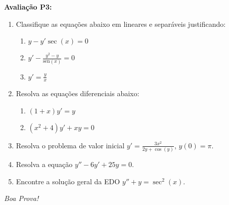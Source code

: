 \documentclass[a4paper,5pt]{amsbook}
\newcommand{\sen}{\text{sen}}
\newcommand{\ds}{\displaystyle}
\begin{document}
\textbf{Avalia\c{c}\~ao P3:}
\begin{enumerate}
\item Classifique as equa\c{c}\~oes abaixo em lineares e separ\'aveis justificando:
	\begin{enumerate}
		\item $\ds y - y' \sec(x) = 0$
		\item $\ds y' - \frac{y^2-y}{\sen(x)} = 0$
		\item $\ds y' = \frac{y}{x}$
	\end{enumerate}

\item Resolva as equa\c{c}\~oes diferenciais abaixo:
	\begin{enumerate}
		\item $(1+x)y' = y$
		\item $(x^2+4)y' + xy = 0$
	\end{enumerate}

\item Resolva o problema de valor inicial $\ds y' = \frac{3x^2}{2y+\cos(y)}$,
	$y(0) = \pi$.

\item Resolva a equa\c{c}\~ao $y''-6y'+25y=0$.

\item Encontre a solu\c{c}\~ao geral da EDO $y''+y=\sec^2(x)$.

\end{enumerate}

\begin{flushright}
	\textit{Boa Prova!}
\end{flushright}
\end{document}

